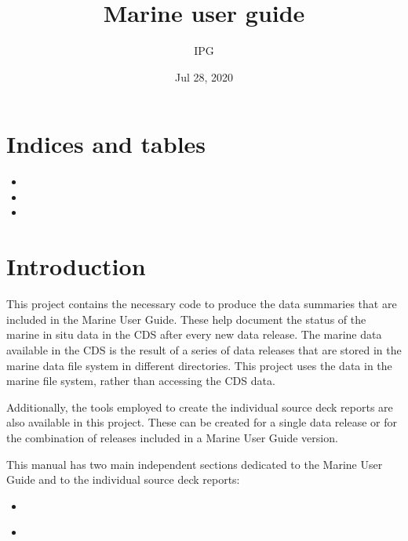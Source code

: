 \documentclass[letterpaper,10pt,english]{sphinxmanual}
\title{Marine user guide}
\date{Jul 28, 2020}
\author{IPG}
\begin{document}
\pagestyle{empty}
\sphinxmaketitle
\pagestyle{plain}
\sphinxtableofcontents
\pagestyle{normal}
\label{\detokenize{index::doc}}



\chapter{Indices and tables}
\label{\detokenize{index:indices-and-tables}}\begin{itemize}
\item {} 

\item {} 

\item {} 

\end{itemize}


\chapter{Introduction}
\label{\detokenize{index:introduction}}
This project contains the necessary code to produce the data summaries that are
included in the Marine User Guide. These help document the status of the marine
in situ data in the CDS after every new data release. The marine data available
in the CDS is the result of a series of data releases that are stored in the
marine data file system in different directories. This project uses the data in
the marine file system, rather than accessing the CDS data.

Additionally, the tools employed to create the individual source deck reports
are also available in this project. These can be created for a single data
release or for the combination of releases included in a Marine User Guide
version.

This manual has two main independent sections dedicated to the Marine User Guide
and to the individual source deck reports:
\begin{itemize}
\item {} 
{\hyperref[\detokenize{index:marine-user-guide}]{}}

\item {} 
{\hyperref[\detokenize{index:source-deck-reports}]{}}

\end{itemize}
\end{document}
